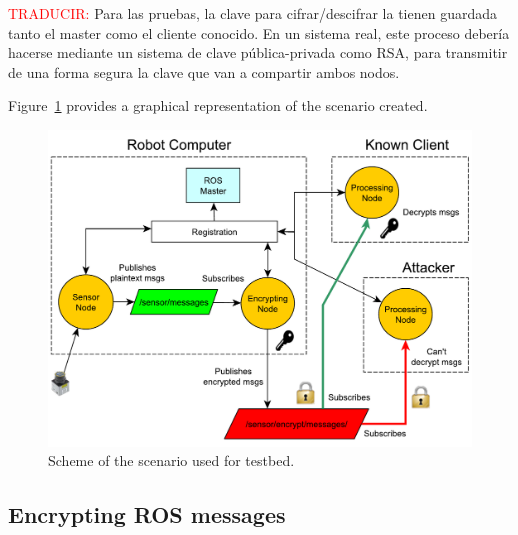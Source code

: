 \documentclass[journal,twoside]{JoPhA}
\begin{document}
\textcolor{red}{TRADUCIR:} Para las pruebas, la clave para cifrar/descifrar la tienen guardada tanto el master como el cliente conocido. En un sistema real, este proceso debería hacerse mediante un sistema de clave pública-privada como RSA, para transmitir de una forma segura la clave que van a compartir ambos nodos.

Figure~\ref{fig:TestBed} provides a graphical representation of the scenario created.


\begin{figure}[ht]
    \centering
    \includegraphics[width=.5\textwidth]{TestBed_complete.pdf}
    \caption{Scheme of the scenario used for testbed.}
  \label{fig:TestBed}
\end{figure}





\subsection{Encrypting ROS messages}


\end{document}
